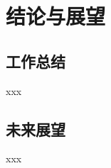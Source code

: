 \cleardoublepage            %
\pagestyle{mainstyle}       %

\section{结论与展望}

\subsection{工作总结}
xxx

\subsection{未来展望}
xxx

\clearpage        %
